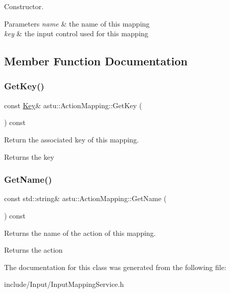 Constructor.


\begin{DoxyParams}{Parameters}
{\em name} & the name of this mapping \\
\hline
{\em key} & the input control used for this mapping \\
\hline
\end{DoxyParams}


\subsection{Member Function Documentation}
\mbox{\label{classastu_1_1ActionMapping_a6a7454094642d1ed34159ac0be511760}} 
\subsubsection{\texorpdfstring{Get\+Key()}{GetKey()}}
{\footnotesize\ttfamily const \hyperlink{classastu_1_1Key}{Key}\& astu\+::\+Action\+Mapping\+::\+Get\+Key (\begin{DoxyParamCaption}{ }\end{DoxyParamCaption}) const}

Return the associated key of this mapping.

\begin{DoxyReturn}{Returns}
the key 
\end{DoxyReturn}
\mbox{\label{classastu_1_1ActionMapping_a2a7b1b72d7d36812c79f05b1cad46095}} 
\subsubsection{\texorpdfstring{Get\+Name()}{GetName()}}
{\footnotesize\ttfamily const std\+::string\& astu\+::\+Action\+Mapping\+::\+Get\+Name (\begin{DoxyParamCaption}{ }\end{DoxyParamCaption}) const}

Returns the name of the action of this mapping.

\begin{DoxyReturn}{Returns}
the action 
\end{DoxyReturn}


The documentation for this class was generated from the following file\+:\begin{DoxyCompactItemize}
\item 
include/\+Input/Input\+Mapping\+Service.\+h\end{DoxyCompactItemize}
